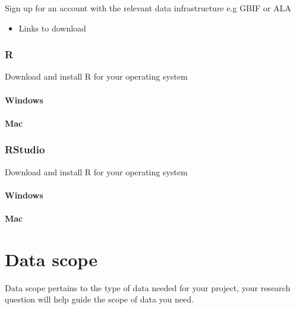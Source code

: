 \documentclass[
  letterpaper,
  DIV=11,
  numbers=noendperiod,
  oneside]{scrreprt}
\providecommand{\tightlist}{%
  \setlength{\itemsep}{0pt}\setlength{\parskip}{0pt}}\usepackage{longtable,booktabs,array}
\begin{document}
Sign up for an account with the relevant data infrastructure e.g GBIF or
ALA

\begin{itemize}
\tightlist
\item
  Links to download
\end{itemize}

\hypertarget{r}{%
\subsection{R}\label{r}}

Download and install R for your operating system

\hypertarget{windows}{%
\subsubsection*{Windows}\label{windows}}

\hypertarget{mac}{%
\subsubsection*{Mac}\label{mac}}

\hypertarget{rstudio}{%
\subsection{RStudio}\label{rstudio}}

Download and install R for your operating system

\hypertarget{windows-1}{%
\subsubsection*{Windows}\label{windows-1}}

\hypertarget{mac-1}{%
\subsubsection*{Mac}\label{mac-1}}


\hypertarget{data-scope}{%
\chapter{Data scope}\label{data-scope}}

Data scope pertains to the type of data needed for your project, your
research question will help guide the scope of data you need.
\end{document}
